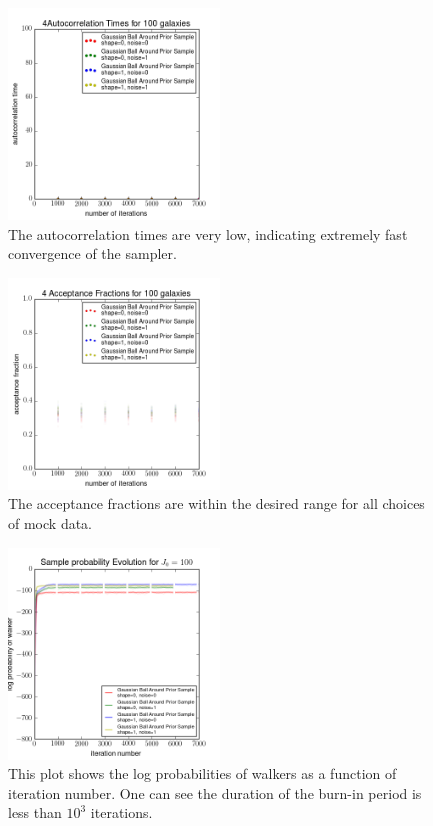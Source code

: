 \documentclass[preprint]{aastex}
\begin{document}
\begin{figure}
\includegraphics[width=0.5\textwidth]{times-toy.png}
\caption{The autocorrelation times are very low, indicating extremely fast convergence of the sampler.}
\label{fig:dumbestacor}
\end{figure}

\begin{figure}
\includegraphics[width=0.5\textwidth]{fracs-toy.png}
\caption{The acceptance fractions are within the desired range for all choices of mock data.}
\label{fig:dumbestfrac}
\end{figure}

\begin{figure}
\includegraphics[width=0.5\textwidth]{probs-toy.png}
\caption{This plot shows the log probabilities of walkers as a function of iteration number.  One can see the duration of the burn-in period is less than $10^{3}$ iterations.}
\label{fig:dumbestprob}
\end{figure}
\end{document}
